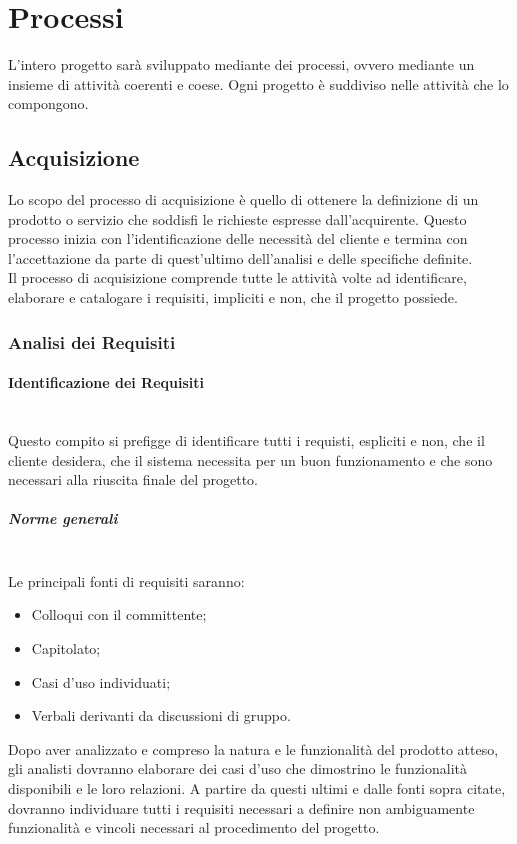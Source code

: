 \newpage
\section{Processi}
L'intero progetto sarà sviluppato mediante dei processi, ovvero mediante un insieme di attivit\`{a} coerenti e coese.
Ogni progetto è suddiviso nelle attivit\`{a} che lo compongono.


\subsection{Acquisizione}
\label{processo_analisi}

Lo scopo del processo di acquisizione è quello di ottenere la definizione di un prodotto o servizio che soddisfi le richieste espresse dall'acquirente.
Questo processo inizia con l'identificazione delle necessità del cliente e termina con l'accettazione da parte di quest'ultimo dell'analisi e delle specifiche definite.\\
Il processo di acquisizione comprende tutte le attivit\`{a} volte ad identificare, elaborare e catalogare i requisiti, impliciti e non, che il progetto possiede.

\subsubsection{Analisi dei Requisiti}
\paragraph{Identificazione dei Requisiti} \hfill \\
Questo compito si prefigge di identificare tutti i requisti, espliciti e non, che il cliente desidera, che il sistema necessita per un buon funzionamento e che sono necessari alla riuscita finale del progetto.

\subparagraph{Norme generali} \hfill \\
Le principali fonti di requisiti saranno:
\begin{itemize}
\item Colloqui con il committente;
\item Capitolato;
\item Casi d'uso individuati;
\item Verbali derivanti da discussioni di gruppo.
\end{itemize}
Dopo aver analizzato e compreso la natura e le funzionalità del prodotto atteso, gli analisti dovranno elaborare dei casi d'uso che dimostrino le funzionalità disponibili e le loro relazioni.
A partire da questi ultimi e dalle fonti sopra citate, dovranno individuare tutti i requisiti necessari a definire non ambiguamente funzionalità e vincoli necessari al procedimento del progetto.


